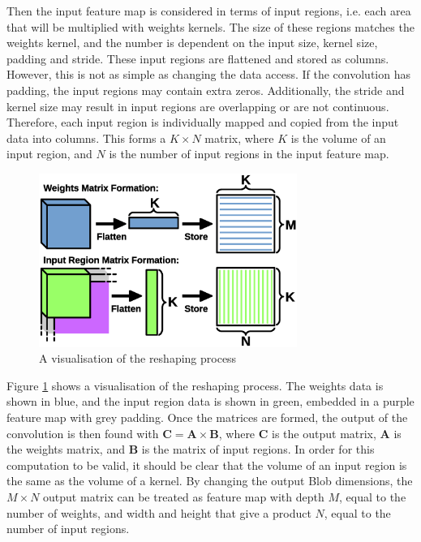 \documentclass[12pt]{article}
\begin{document}
Then the input feature map is considered in terms of input regions, i.e. each area that will be multiplied with weights kernels. The size of these regions matches the weights kernel, and the number is dependent on the input size, kernel size, padding and stride.  These input regions are flattened and stored as columns. However, this is not as simple as changing the data access. If the convolution has padding, the input regions may contain extra zeros. Additionally, the stride and kernel size may result in input regions are overlapping or are not continuous. Therefore, each input region is individually mapped and copied from the input data into columns. This forms a $K \times N$ matrix, where $K$ is the volume of an input region, and $N$ is the number of input regions in the input feature map.

\begin{figure} [H]
\centering
\includegraphics[width=0.75\textwidth]{figures/im2col.eps}
\caption{A visualisation of the reshaping process} 
\label{fig:im2col}
\end{figure}

Figure \ref{fig:im2col} shows a visualisation of the reshaping process. The weights data is shown in blue, and the input region data is shown in green, embedded in a purple feature map with grey padding. Once the matrices are formed, the output of the convolution is then found with \( \mathbf{C} = \mathbf{A}\times\mathbf{B}\), where $\mathbf{C}$ is the output matrix, $\mathbf{A}$ is the weights matrix, and $\mathbf{B}$ is the matrix of input regions. In order for this computation to be valid, it should be clear that the volume of an input region is the same as the volume of a kernel. By changing the output Blob dimensions, the $M \times N$ output matrix can be treated as feature map with depth $M$, equal to the number of weights, and width and height that give a product $N$, equal to the number of input regions.
\end{document}
